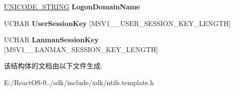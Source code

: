 \begin{DoxyCompactItemize}
\hyperlink{struct___u_n_i_c_o_d_e___s_t_r_i_n_g}{U\+N\+I\+C\+O\+D\+E\+\_\+\+S\+T\+R\+I\+NG} {\bfseries Logon\+Domain\+Name}
\item 
\mbox{\label{struct___m_s_v1__0___g_e_t_c_h_a_l_l_e_n_r_e_s_p___r_e_s_p_o_n_s_e_aae81c8bd3d8d4111cad487dc25ae93cd}} 
U\+C\+H\+AR {\bfseries User\+Session\+Key} \mbox{[}M\+S\+V1\+\_\+\_\+\+U\+S\+E\+R\+\_\+\+S\+E\+S\+S\+I\+O\+N\+\_\+\+K\+E\+Y\+\_\+\+L\+E\+N\+G\+TH\mbox{]}
\item 
\mbox{\label{struct___m_s_v1__0___g_e_t_c_h_a_l_l_e_n_r_e_s_p___r_e_s_p_o_n_s_e_a698e52f5593926905ba9c3506db4e664}} 
U\+C\+H\+AR {\bfseries Lanman\+Session\+Key} \mbox{[}M\+S\+V1\+\_\+\_\+\+L\+A\+N\+M\+A\+N\+\_\+\+S\+E\+S\+S\+I\+O\+N\+\_\+\+K\+E\+Y\+\_\+\+L\+E\+N\+G\+TH\mbox{]}
\end{DoxyCompactItemize}


该结构体的文档由以下文件生成\+:\begin{DoxyCompactItemize}
\item 
E\+:/\+React\+O\+S-\/0../sdk/include/xdk/ntifs.\+template.\+h\end{DoxyCompactItemize}
